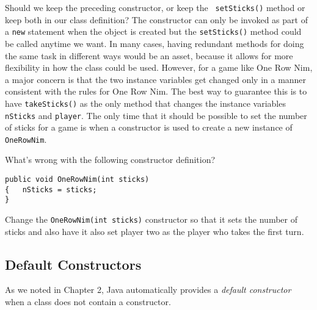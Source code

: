 Should we keep the preceding constructor, or keep the {\tt
setSticks()} method or keep both in our class definition?  The
constructor can only be invoked as part of a {\tt new} statement when
the object is created but the {\tt setSticks()} method could be called
anytime we want. In many cases, having redundant methods for doing the
same task in different ways would be an asset, because it allows for
more flexibility in how the class could be used.  However, for a game
like One Row Nim, a major concern is that the two instance variables
get changed only in a manner consistent with the rules for One Row
Nim.  The best way to guarantee this is to have {\tt takeSticks()} as
the only method that changes the instance variables {\tt nSticks} and
{\tt player}.  The only time that it should be possible to set the
number of sticks for a game is when a constructor is used to create a
new instance of {\tt OneRowNim}.


\begin{SSTUDY}
\item  What's wrong with the following
constructor definition?

\begin{jjjlisting}
\begin{lstlisting}
public void OneRowNim(int sticks)
{   nSticks = sticks;
}
\end{lstlisting}
\end{jjjlisting}

\item  Change the {\tt OneRowNim(int sticks)} constructor so
that it sets the number of sticks and also have it also set player two
as the player who takes the first turn.

\end{SSTUDY}

\subsection{Default Constructors}
\label{sec-defaultconstructors}
\noindent As we noted in Chapter 2, Java automatically provides a 
{\it default constructor} when a class does not contain a constructor.



